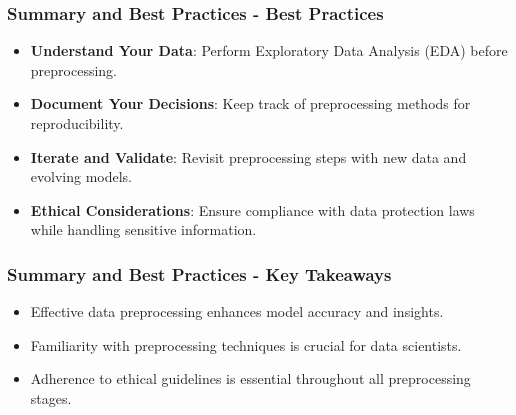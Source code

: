 \documentclass[aspectratio=169]{beamer}
\begin{document}
\begin{frame}[fragile]
    \frametitle{Summary and Best Practices - Best Practices}
    \begin{itemize}
        \item \textbf{Understand Your Data}: Perform Exploratory Data Analysis (EDA) before preprocessing.
        \item \textbf{Document Your Decisions}: Keep track of preprocessing methods for reproducibility.
        \item \textbf{Iterate and Validate}: Revisit preprocessing steps with new data and evolving models.
        \item \textbf{Ethical Considerations}: Ensure compliance with data protection laws while handling sensitive information.
    \end{itemize}
\end{frame}

\begin{frame}[fragile]
    \frametitle{Summary and Best Practices - Key Takeaways}
    \begin{itemize}
        \item Effective data preprocessing enhances model accuracy and insights.
        \item Familiarity with preprocessing techniques is crucial for data scientists.
        \item Adherence to ethical guidelines is essential throughout all preprocessing stages.
    \end{itemize}
\end{frame}
\end{document}
